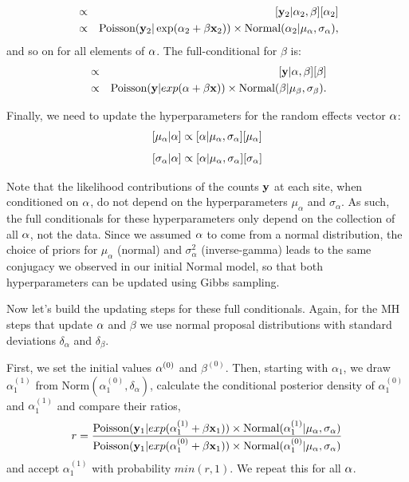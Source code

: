 \begin{eqnarray*}
[\alpha_2|\alpha_1,\alpha_3,\ldots,\alpha_i,\beta,{\bf y}_{2}] & \propto&  [{\bf y}_{2}|\alpha_2,\beta]  [\alpha_2] \\
	 & \propto  & \mbox{Poisson}({\bf y}_{2}| \exp(\alpha_2 + \beta {\bf x}_2)) \times \mbox{Normal}(\alpha_2|\mu_{\alpha}, \sigma_{\alpha}),
\end{eqnarray*}
and so on for all elements of ${\bf \alpha}$. The full-conditional for $\beta$ is:
\begin{eqnarray*}
[\beta|{\bf \alpha},{\bf y}] &\propto & [{\bf y}|{\bf \alpha},\beta]  [\beta] \\
	 &\propto& \mbox{Poisson}({\bf y}|exp({\bf \alpha} + \beta {\bf x})) \times \mbox{Normal}(\beta|\mu_{\beta}, \sigma_{\beta}).
\end{eqnarray*}

Finally, we need to update the hyperparameters for the random effects
vector ${\bf \alpha}$:
\[
[\mu_{\alpha}|{\bf \alpha}] \propto [{\bf \alpha}|\mu_{\alpha}, \sigma_{\alpha}] [\mu_{\alpha}]
\]
\[
[\sigma_{\alpha}|{\bf\alpha}] \propto [{\bf \alpha}|\mu_{\alpha}, \sigma_{\alpha}] [\sigma_{\alpha}]
\]

Note that the likelihood contributions of the counts ${\bf y}$ at each site, when conditioned on ${\bf \alpha}$, do not depend
on the hyperparameters $\mu_{\alpha}$ and $\sigma_{\alpha}$.  As such, the full conditionals
for these hyperparameters only depend on the collection of
all ${\bf \alpha}$, not the data.
Since we assumed ${\bf \alpha}$ to come from a normal distribution,
the choice of priors for $\mu_{\alpha}$ (normal) and $\sigma_{\alpha}^2$
(inverse-gamma) leads to the same conjugacy we observed in our initial
Normal model, so that both hyperparameters can be updated using Gibbs
sampling.

Now let's build the updating steps for these full conditionals. Again,
for the MH steps that update ${\bf \alpha}$ and $\beta$ we use normal
proposal distributions with standard deviations $\delta_{\alpha}$ and
$\delta_{\beta}$.

First, we set the initial values ${\bf \alpha}^{(0)}$ and
$\beta^{(0)}$. Then, starting with $\alpha_1$, we draw
$\alpha_1^{(1)}$ from $\mbox{Norm}(\alpha_1^{(0)}, \delta_{\alpha})$,
calculate the conditional posterior density of $\alpha_1^{(0)}$ and
$\alpha_1^{(1)}$ and compare their ratios,
\[
r = \frac{\mbox{Poisson}({\bf y}_{1}|exp(\alpha_1^{(1)} + \beta {\bf x}_1)) \times
  \mbox{Normal}(\alpha_1^{(1)}|\mu_{\alpha}, \sigma_{\alpha})} {\mbox{Poisson}({\bf y}_{1}|exp(\alpha_1^{(0)} + \beta {\bf x}_1)) \times \mbox{Normal}(\alpha_1^{(0)}|\mu_{\alpha}, \sigma_{\alpha})}
\]
and accept $\alpha_1^{(1)}$ with probability $min(r,1)$. We repeat this for all ${\bf \alpha}$.

